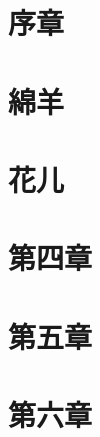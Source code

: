 \documentclass[12pt,a4paper,oneside,openany]{book}
\begin{document}
\tableofcontents

\chapter{序章}


\chapter{綿羊}


\chapter{花儿}


\chapter{第四章}


\chapter{第五章}


\chapter{第六章}

\end{document}
